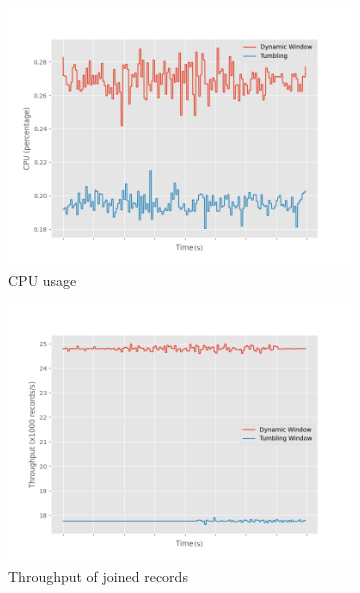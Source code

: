 \begin{figure}
    \begin{subfigure}[b]{0.5\columnwidth}
        \includegraphics[width=\columnwidth]{fig/periodic/cpu_comparison.png}
        \caption{CPU usage}
        \label{fig:periodic_cpu}
    \end{subfigure}
    \hfill 
    \begin{subfigure}[b]{0.5\columnwidth}
        \includegraphics[width=\columnwidth]{fig/periodic/throughput_comparison.png}
        \caption{Throughput of joined records}
        \label{fig:periodic_throughput}
    \end{subfigure}
    \begin{subfigure}[b]{0.5\columnwidth}

\end{subfigure}
\end{figure}
